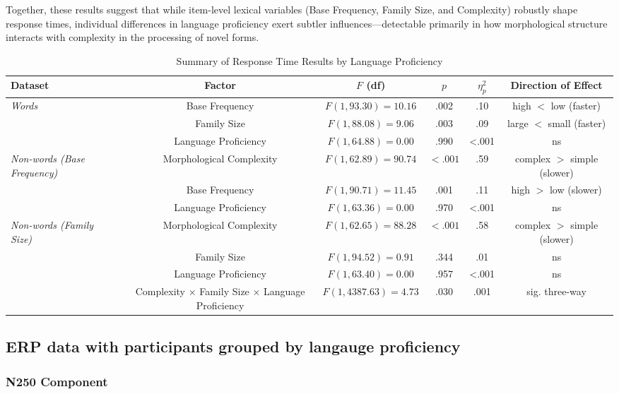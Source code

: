 	Together, these results suggest that while item-level lexical variables (Base Frequency, Family Size, and Complexity) robustly shape response times, individual differences in language proficiency exert subtler influences—detectable primarily in how morphological structure interacts with complexity in the processing of novel forms.
	
	\begin{table}[ht]
		\centering
		\caption{Summary of Response Time Results by Language Proficiency}
		\begin{tabular}{lccccc}
			\toprule
			\textbf{Dataset} & \textbf{Factor} & \textbf{$F$ (df)} & \textbf{$p$} & \textbf{$\eta^2_p$} & \textbf{Direction of Effect} \\
			\midrule
			\textit{Words} & Base Frequency & $F(1, 93.30) = 10.16$ & .002 & .10 & high $<$ low (faster) \\
			& Family Size & $F(1, 88.08) = 9.06$ & .003 & .09 & large $<$ small (faster) \\
			& Language Proficiency & $F(1, 64.88) = 0.00$ & .990 & <.001 & ns \\
			\midrule
			\textit{Non-words (Base Frequency)} & Morphological Complexity & $F(1, 62.89) = 90.74$ & $< .001$ & .59 & complex $>$ simple (slower) \\
			& Base Frequency & $F(1, 90.71) = 11.45$ & .001 & .11 & high $>$ low (slower) \\
			& Language Proficiency & $F(1, 63.36) = 0.00$ & .970 & <.001 & ns \\
			\midrule
			\textit{Non-words (Family Size)} & Morphological Complexity & $F(1, 62.65) = 88.28$ & $< .001$ & .58 & complex $>$ simple (slower) \\
			& Family Size & $F(1, 94.52) = 0.91$ & .344 & .01 & ns \\
			& Language Proficiency & $F(1, 63.40) = 0.00$ & .957 & <.001 & ns \\
			& Complexity × Family Size × Language Proficiency & $F(1, 4387.63) = 4.73$ & .030 & .001 & sig. three-way \\
			\bottomrule
		\end{tabular}
	\end{table}


\subsection{ERP data with participants grouped by langauge proficiency}

\subsubsection{N250 Component}

